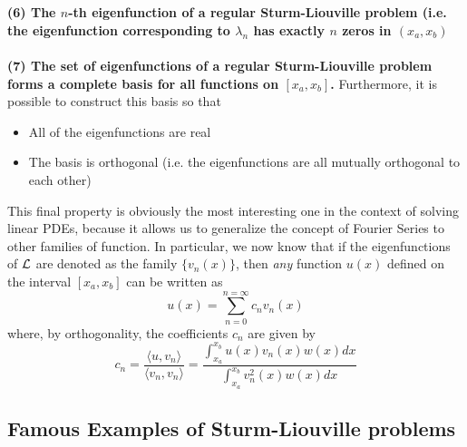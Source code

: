 \\
\\
{\bf (6) The $n$-th eigenfunction of a regular Sturm-Liouville problem (i.e. the eigenfunction corresponding to $\lambda_n$ has exactly $n$ zeros in $(x_a,x_b)$}
\\
\\
{\bf (7) The set of eigenfunctions of a regular Sturm-Liouville problem forms a complete basis for all functions on $[x_a,x_b]$.} Furthermore, it is possible to construct this basis so that
\begin{itemize}
    \item All of the eigenfunctions are real
    \item The basis is orthogonal (i.e. the eigenfunctions are all mutually orthogonal to each other)
\end{itemize}

This final property is obviously the most interesting one in the context of solving linear  PDEs, because it allows us to generalize the concept of Fourier Series to other families of function. In particular, we now know that if the eigenfunctions of ${\cal L}$ are denoted as the family $\{v_n(x)\}$, then {\it any} function $u(x)$ defined on the interval $[x_a,x_b]$ can be written as 
\begin{equation}
    u(x) = \sum_{n=0}^{n=\infty} c_n v_n(x) 
\end{equation}
where, by orthogonality, the coefficients $c_n$ are given by 
\begin{equation}
    c_n = \frac{ \langle u,v_n \rangle }{\langle v_n, v_n \rangle}= \frac{ \int_{x_a}^{x_b} u(x)v_n(x) w(x) dx  }{\int_{x_a}^{x_b} v^2_n(x) w(x) dx  } 
\end{equation}

\subsection{Famous Examples of Sturm-Liouville problems}

